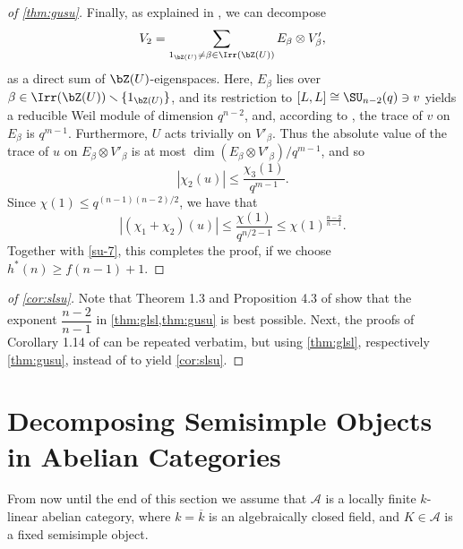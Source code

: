\documentclass[eqthmnum,nocolour,skinny]{jt-calcs}
\begin{document}
\begin{proof}[of \cref{thm:gusu}]
Finally, as explained in \cite[\S5]{GMST}, we can decompose
\begin{equation*}
V_2 = \sum_{1_{\bZ(U)} \neq \beta \in \Irr(\bZ(U))}E_\beta \otimes V'_\beta,
\end{equation*}
as a direct sum of $\bZ(U)$-eigenspaces. Here, $E_\beta$ lies over $\beta \in  \Irr(\bZ(U)) \smallsetminus \{1_{\bZ(U)}\}$, and its restriction to 
$[L,L] \cong \SU_{n-2}(q) \ni v$ yields a reducible Weil module of dimension $q^{n-2}$, and, according to \cite[\S4]{TZ}, the trace of 
$v$ on $E_\beta$ is $q^{m-1}$. Furthermore, $U$ acts trivially on $V'_\beta$. Thus the absolute value of the trace of $u$ on 
$E_\beta \otimes V'_\beta$ is at most $\dim(E_\beta \otimes V'_\beta)/q^{m-1}$, and so
\begin{equation}\label{su-9}
|\chi_2(u)| \leq \frac{\chi_3(1)}{q^{m-1}}.
\end{equation}   
Since $\chi(1) \leq q^{(n-1)(n-2)/2}$, we have that
\begin{equation*}
|(\chi_1+\chi_2)(u)| \leq \frac{\chi(1)}{q^{n/2-1}} \leq \chi(1)^{\frac{n-2}{n-1}}.
\end{equation*}
Together with \eqref{su-7}, this completes the proof, if we choose $h^*(n) \geq f(n-1)+1$.
\end{proof}

\begin{proof}[of \cref{cor:slsu}]
Note that Theorem 1.3 and Proposition 4.3 of \cite{bezrukavnikov-liebeck-shalev-tiep:2017:character-bounds-grps-Lie-type} show that 
the exponent $\dfrac{n-2}{n-1}$ in \cref{thm:glsl,thm:gusu} is best possible. Next, the proofs of Corollary 1.14 of \cite{bezrukavnikov-liebeck-shalev-tiep:2017:character-bounds-grps-Lie-type} can be repeated verbatim, but using \cref{thm:glsl}, respectively \cref{thm:gusu}, instead of \cite[Thm.~1.5]{bezrukavnikov-liebeck-shalev-tiep:2017:character-bounds-grps-Lie-type} to yield \cref{cor:slsu}.
\end{proof}

\appendix
\section{Decomposing Semisimple Objects in Abelian Categories}\label{sec:decomp-semisimple-obj}
\begin{assumption}
From now until the end of this section we assume that $\mathscr{A}$ is a locally finite $k$-linear abelian category, where $k = \overline{k}$ is an algebraically closed field, and $K \in \mathscr{A}$ is a fixed semisimple object.
\end{assumption}
\end{document}
